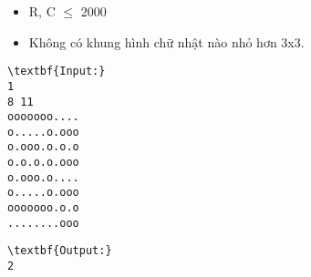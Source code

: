 \begin{itemize}
	\item R, C  $\le$  2000
	\item Không có khung hình chữ nhật nào nhỏ hơn 3x3.
\end{itemize}
\begin{verbatim}
\textbf{Input:}
1
8 11
ooooooo....
o.....o.ooo
o.ooo.o.o.o
o.o.o.o.ooo
o.ooo.o....
o.....o.ooo
ooooooo.o.o
........ooo\end{verbatim}
\begin{verbatim}
\textbf{Output:}
2\end{verbatim}